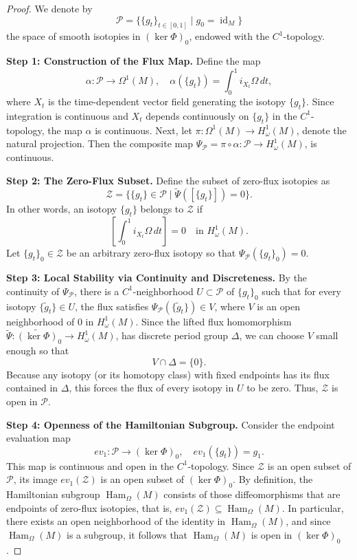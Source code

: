 \documentclass[10pt,a4paper]{amsart}
\newcommand{\Ham}{\operatorname{Ham}}
\newcommand{\id}{\operatorname{id}}
\begin{document}
	\begin{proof}
		We denote by
		\[
		\mathcal{P} = \{ \{g_t\}_{t \in [0,1]} \mid g_0 = \id_M \}
		\]
		the space of smooth isotopies in $(\ker \Phi)_0$, endowed with the $C^1$-topology.
		
		\textbf{Step 1: Construction of the Flux Map.} Define the map
		\[
		\alpha : \mathcal{P} \to \Omega^1(M), \quad \alpha(\{g_t\}) = \int_0^1 i_{X_t}\Omega \, dt,
		\]
		where $X_t$ is the time-dependent vector field generating the isotopy $\{g_t\}$. Since integration is continuous and $X_t$ depends continuously on $\{g_t\}$ in the $C^1$-topology, the map $\alpha$ is continuous. Next, let $\pi : \Omega^1(M) \to H_\omega^1(M)$, denote the natural projection. Then the composite map $\Psi_{\mathcal{P}} = \pi \circ \alpha : \mathcal{P} \to H_\omega^1(M)$, is continuous.
		
		\textbf{Step 2: The Zero-Flux Subset.} Define the subset of zero-flux isotopies as
		\[
		\mathcal{Z} = \{ \{g_t\} \in \mathcal{P} \mid \widetilde{\Psi}([\{g_t\}]) = 0 \}.
		\]
		In other words, an isotopy $\{g_t\}$ belongs to $\mathcal{Z}$ if
		\[
		\left[ \int_0^1 i_{X_t}\Omega \, dt \right] = 0 \quad \text{in } H_\omega^1(M).
		\]
		Let $\{g_t\}_0 \in \mathcal{Z}$ be an arbitrary zero-flux isotopy so that $\Psi_{\mathcal{P}}(\{g_t\}_0) = 0$.
		
		\textbf{Step 3: Local Stability via Continuity and Discreteness.} By the continuity of $\Psi_{\mathcal{P}}$, there is a $C^1$-neighborhood $U \subset \mathcal{P}$ of $\{g_t\}_0$ such that for every isotopy $\{\tilde{g}_t\} \in U$, the flux satisfies $\Psi_{\mathcal{P}}(\{\tilde{g}_t\}) \in V$, where $V$ is an open neighborhood of $0$ in $H_\omega^1(M)$. Since the lifted flux homomorphism $\widetilde{\Psi} : \widetilde{(\ker \Phi)}_0 \to H_\omega^1(M)$, has discrete period group $\Delta$, we can choose $V$ small enough so that
		\[
		V \cap \Delta = \{0\}.
		\]
		Because any isotopy (or its homotopy class) with fixed endpoints has its flux contained in $\Delta$, this forces the flux of every isotopy in $U$ to be zero. Thus, $\mathcal{Z}$ is open in $\mathcal{P}$.
		
		\textbf{Step 4: Openness of the Hamiltonian Subgroup.} Consider the endpoint evaluation map
		\[
		ev_1 : \mathcal{P} \to (\ker \Phi)_0, \quad ev_1(\{g_t\}) = g_1.
		\]
		This map is continuous and open in the $C^1$-topology. Since $\mathcal{Z}$ is an open subset of $\mathcal{P}$, its image $ev_1(\mathcal{Z})$ is an open subset of $(\ker \Phi)_0$. By definition, the Hamiltonian subgroup $\Ham_\Omega(M)$ consists of those diffeomorphisms that are endpoints of zero-flux isotopies, that is, $ev_1(\mathcal{Z}) \subseteq \Ham_\Omega(M)$. In particular, there exists an open neighborhood of the identity in $\Ham_\Omega(M)$, and since $\Ham_\Omega(M)$ is a subgroup, it follows that $\Ham_\Omega(M)$ is open in $(\ker \Phi)_0$.
	\end{proof}
\end{document}
